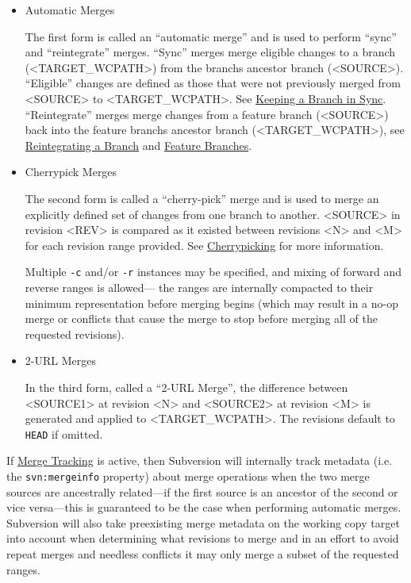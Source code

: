 \begin{itemize}
\item
  Automatic Merges

  The first form is called an ``automatic merge'' and is used to perform
  ``sync'' and ``reintegrate'' merges. ``Sync'' merges merge eligible
  changes to a branch (\textless TARGET\_WCPATH\textgreater) from the
  branch\textquotesingle s ancestor branch
  (\textless SOURCE\textgreater). ``Eligible'' changes are defined as
  those that were not previously merged from
  \textless SOURCE\textgreater{} to
  \textless TARGET\_WCPATH\textgreater. See
  \hyperref[svn.branchmerge.basicmerging.stayinsync]{Keeping a Branch in
  Sync}. ``Reintegrate'' merges merge changes from a feature branch
  (\textless SOURCE\textgreater) back into the feature
  branch\textquotesingle s ancestor branch
  (\textless TARGET\_WCPATH\textgreater), see
  \hyperref[svn.branchmerge.basicmerging.reintegrate]{Reintegrating a
  Branch} and \hyperref[svn.branchmerge.commonpatterns.feature]{Feature
  Branches}.
\item
  Cherrypick Merges

  The second form is called a ``cherry-pick'' merge and is used to merge
  an explicitly defined set of changes from one branch to another.
  \textless SOURCE\textgreater{} in revision \textless REV\textgreater{}
  is compared as it existed between revisions \textless N\textgreater{}
  and \textless M\textgreater{} for each revision range provided. See
  \hyperref[svn.branchmerge.cherrypicking]{Cherrypicking} for more
  information.

  Multiple \texttt{-c} and/or \texttt{-r} instances may be specified,
  and mixing of forward and reverse ranges is allowed--- the ranges are
  internally compacted to their minimum representation before merging
  begins (which may result in a no-op merge or conflicts that cause the
  merge to stop before merging all of the requested revisions).
\item
  2-URL Merges

  In the third form, called a ``2-URL Merge'', the difference between
  \textless SOURCE1\textgreater{} at revision \textless N\textgreater{}
  and \textless SOURCE2\textgreater{} at revision
  \textless M\textgreater{} is generated and applied to
  \textless TARGET\_WCPATH\textgreater. The revisions default to
  \texttt{HEAD} if omitted.
\end{itemize}

If \hyperref[svn.branchmerge.basicmerging.mergetracking]{Merge Tracking}
is active, then Subversion will internally track metadata (i.e. the
\texttt{svn:mergeinfo} property) about merge operations when the two
merge sources are ancestrally related---if the first source is an
ancestor of the second or vice versa---this is guaranteed to be the case
when performing automatic merges. Subversion will also take preexisting
merge metadata on the working copy target into account when determining
what revisions to merge and in an effort to avoid repeat merges and
needless conflicts it may only merge a subset of the requested ranges.

